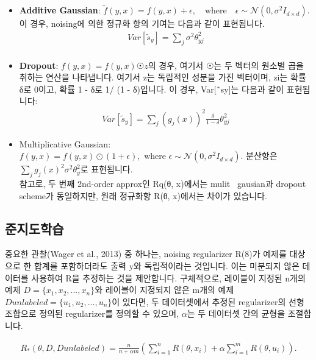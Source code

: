 \documentclass{article}
\begin{document}
\begin{itemize}
    \item \textbf{Additive Gaussian}:
    $\tilde{f}(y, x) = f(y, x) + \epsilon, \quad \text{where} \quad \epsilon \sim \mathcal{N}(0, \sigma^2 I_{d \times d}).$\\
    이 경우, noising에 의한 정규화 항의 기여는 다음과 같이 표현됩니다.\\
    \begin{align*}
        Var[\tilde{s}_y] = \sum_j \sigma^2 \theta^2_{yj}\\
    \end{align*}
    
    \item \textbf{Dropout}:
    $f(y, x) = f(y, x) ☉ z$의 경우, 여기서 $☉$는 두 벡터의 원소별 곱을 취하는 연산을 나타냅니다. 여기서 z는 독립적인 성분을 가진 벡터이며, zi는 확률 δ로 0이고, 확률 1 - δ로 1/ (1 - δ)입니다. 이 경우, Var[˜sy]는 다음과 같이 표현됩니다:\\
    \begin{align*}
        Var[\tilde{s}_y] = \sum_j (g_j(x))^2 \frac{\delta}{1 - \delta} \theta_{yj}^2
    \end{align*}

    \item Multiplicative Gaussian:
    $f(y, x) = f(y, x) \odot (1 + \epsilon), \text{ where } \epsilon \sim \mathcal{N}(0, \sigma^2 I_{d \times d})$. 분산항은 $\sum_j g_j(x)^2 \sigma^2 \theta_y^2$로 표현됩니다.\\ 
    참고로, 두 번째 2nd-order approx인 Rq(θ, x)에서는 mulit~ gausian과 dropout scheme가 동일하지만, 원래 정규화항 R(θ, x)에서는 차이가 있습니다.
\end{itemize}

\subsection{준지도학습}
중요한 관찰(Wager et al., 2013) 중 하나는, noising regularizer R(8)가 예제를 대상으로 한 합계를 포함하더라도 출력 y와 독립적이라는 것입니다. 이는 미분되지 않은 데이터를 사용하여 R을 추정하는 것을 제안합니다. 구체적으로, 레이블이 지정된 n개의 예제 $D = \{x_1, x_2, . . . , x_n\}$와 레이블이 지정되지 않은 m개의 예제 $Dunlabeled = \{u_1, u_2, . . . , u_n\}$이 있다면, 두 데이터셋에서 추정된 regularizer의 선형 조합으로 정의된 regularizer를 정의할 수 있으며, $α$는 두 데이터셋 간의 균형을 조절합니다.

\begin{align}
    R_*(\theta, D, Dunlabeled) = \frac{n}{n + \alpha m} \left( \sum_{i=1}^n R(\theta, x_i) + \alpha \sum_{i=1}^m R(\theta, u_i) \right).
\end{align}
\end{document}
